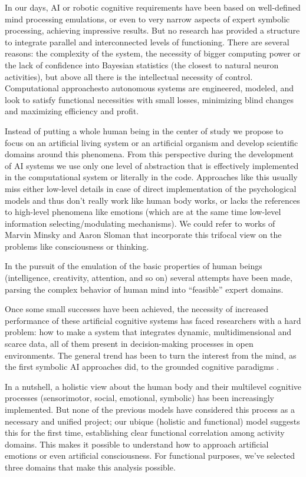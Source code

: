 In our days, AI or robotic cognitive requirements have been based on
well-defined mind processing emulations, or even to very narrow aspects
of expert symbolic processing, achieving impressive results. But no
research has provided a structure to integrate parallel and
interconnected levels of functioning. There are several reasons: the
complexity of the system, the necessity of bigger computing power or the
lack of confidence into Bayesian statistics (the closest to natural
neuron activities), but above all there is the intellectual necessity of
control. Computational approachesto autonomous systems are engineered,
modeled, and look to satisfy functional necessities with small losses,
minimizing blind changes and maximizing efficiency and profit.

Instead of putting a whole human being in the center of study we propose
to focus on an artificial living system or an artificial organism and
develop scientific domains around this phenomena. From this perspective
during the development of AI systems we use only one level of
abstraction that is effectively implemented in the computational system
or literally in the code. Approaches like this usually miss either
low-level details in case of direct implementation of the psychological
models and thus don't really work like human body works, or lacks the
references to high-level phenomena like emotions (which are at the same
time low-level information selecting/modulating mechanisms). We could
refer to works of Marvin Minsky \cite{minsky1988, emotionmachine} and
Aaron Sloman \cite{sloman2003} that incorporate this trifocal view on
the problems like consciousness or thinking.

In the pursuit of the emulation of the basic properties of human beings
(intelligence, creativity, attention, and so on) several attempts have
been made, parsing the complex behavior of human mind into ``feasible''
expert domains.

Once some small successes have been achieved, the necessity of increased
performance of these artificial cognitive systems has faced researchers
with a hard problem: how to make a system that integrates dynamic,
multidimensional and scarce data, all of them present in decision-making
processes in open environments. The general trend has been to turn the
interest from the mind, as the first symbolic AI approaches did, to the
grounded cognitive paradigms \cite{Barsalou2008}.

In a nutshell, a holistic view about the human body and their multilevel
cognitive processes (sensorimotor, social, emotional, symbolic) has been
increasingly implemented. But none of the previous models have
considered this process as a necessary and unified project; our ubique
(holistic and functional) model suggests this for the first time,
establishing clear functional correlation among activity domains. This
makes it possible to understand how to approach artificial emotions or
even artificial consciousness. For functional purposes, we've selected
three domains that make this analysis possible.

